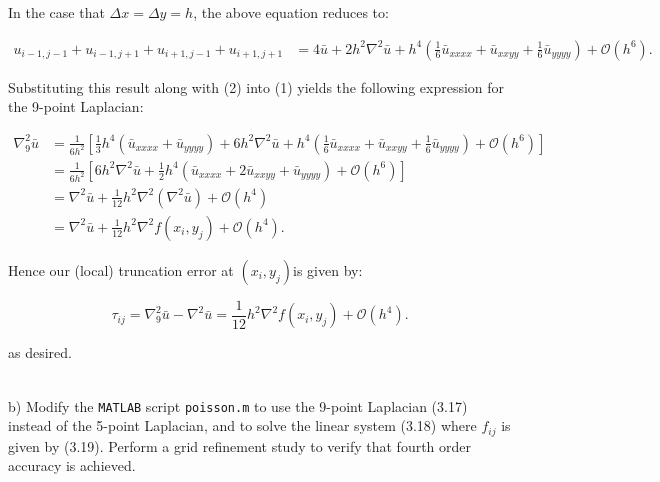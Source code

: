 \begin{solution}
   In the case that $\Delta x = \Delta y = h$, the above equation reduces to:

   \begin{align*}
      u_{i-1, j-1} + u_{i-1, j+1} + u_{i+1, j-1} + u_{i+1, j+1} &= 4 \bar{u} + 2 h^2 \nabla^2 \bar{u}
                                                                   + h^4 \left(\frac{1}{6}\bar{u}_{xxxx} + \bar{u}_{xxyy} +  \frac{1}{6}\bar{u}_{yyyy}\right) + \mathcal{O}(h^6).
   \end{align*}

   \pagebreak
   Substituting this result along with (2) into (1) yields the following expression for the 9-point Laplacian:

   \begin{align*}
      \nabla_9^2 \bar{u} &= \frac{1}{6h^2} \left[
                           \frac{1}{3} h^4 (\bar{u}_{xxxx} + \bar{u}_{yyyy}) + 6 h^2 \nabla^2 \bar{u}
                              + h^4 \left(\frac{1}{6}\bar{u}_{xxxx} + \bar{u}_{xxyy} + \frac{1}{6}\bar{u}_{yyyy}\right) + \mathcal{O}(h^6)
                           \right] \\
                         &= \frac{1}{6h^2} \left[
                              6 h^2 \nabla^2 \bar{u} 
                              + \frac{1}{2} h^4 \left(\bar{u}_{xxxx} + 2 \bar{u}_{xxyy} + \bar{u}_{yyyy}\right) 
                              + \mathcal{O}(h^6)
                           \right] \\
                         &= \nabla^2 \bar{u} + \frac{1}{12} h^2 \nabla^2(\nabla^2 \bar{u}) + \mathcal{O}(h^4) \\
                         &= \nabla^2 \bar{u} + \frac{1}{12} h^2 \nabla^2 f(x_i, y_j) + \mathcal{O}(h^4).
   \end{align*}

   Hence our (local) truncation error at $(x_i, y_j)$is given by:
   
   $$
      \tau_{ij} = \nabla_9^2 \bar{u} - \nabla^2 \bar{u} = \frac{1}{12} h^2 \nabla^2 f(x_i, y_j) + \mathcal{O}(h^4).
   $$

   as desired.
   \ \\\\
\end{solution}

\pagebreak
b) Modify the \texttt{MATLAB} script \texttt{poisson.m} to use the 9-point Laplacian (3.17) instead of the 5-point
   Laplacian, and to solve the linear system (3.18) where $f_{ij}$ is given by (3.19). Perform a grid refinement study
   to verify that fourth order accuracy is achieved.

\begin{solution}\ \\\\
\end{solution}